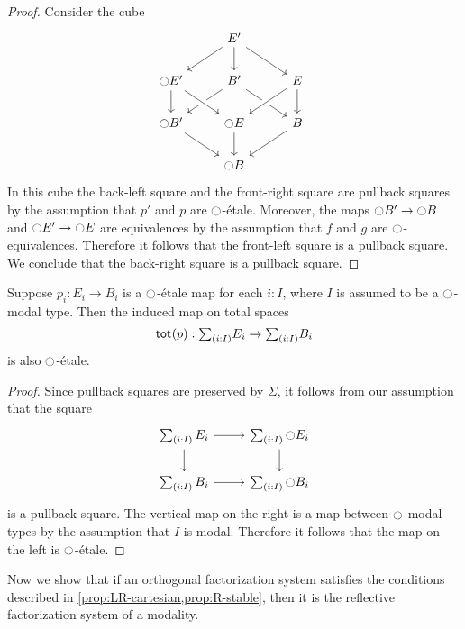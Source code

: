 \documentclass[9pt,twosided]{amsart}
\begin{document}
\begin{proof}
  Consider the cube
  \begin{equation*}
    \begin{tikzcd}
      & E' \arrow[dl] \arrow[d] \arrow[dr] & \phantom{\modal E'} \\
      \modal E' \arrow[d] & B' \arrow[dl] \arrow[dr] & E \arrow[d] \arrow[dl,crossing over] \\
      \modal B' \arrow[dr] & \modal E \arrow[from=ul,crossing over] \arrow[d] & B \arrow[dl] \\
      & \modal B & \phantom{\modal B'}
    \end{tikzcd}
  \end{equation*}
  In this cube the back-left square and the front-right square are pullback squares by the assumption that $p'$ and $p$ are ${\ocircle}$-\'etale. Moreover, the maps ${\ocircle} B'\to{\ensuremath{\ocircle}} B$ and ${\ocircle} E'\to{\ensuremath{\ocircle}} E$ are equivalences by the assumption that $f$ and $g$ are ${\ocircle}$-equivalences. Therefore it follows that the front-left square is a pullback square. We conclude that the back-right square is a pullback square.
\end{proof}

\begin{prp}\label{prop:R-stable}
  Suppose $p_i:E_i\to B_i$ is a ${\ocircle}$-\'etale map for each $i:I$, where $I$ is assumed to be a ${\ocircle}$-modal type. Then the induced map on total spaces
  \begin{equation*}
    \total{p} : \sm{i:I}E_i\to \sm{i:I}B_i
  \end{equation*}
  is also ${\ocircle}$-\'etale.
\end{prp}

\begin{proof}
  Since pullback squares are preserved by $\Sigma$, it follows from our assumption that the square
  \begin{equation*}
    \begin{tikzcd}
      \sm{i:I}E_i \arrow[r] \arrow[d] & \sm{i:I}\modal E_i \arrow[d] \\
      \sm{i:I}B_i \arrow[r] & \sm{i:I}\modal B_i
    \end{tikzcd}
  \end{equation*}
  is a pullback square. The vertical map on the right is a map between ${\ocircle}$-modal types by the assumption that $I$ is modal. Therefore it follows that the map on the left is ${\ocircle}$-\'etale.
\end{proof}

Now we show that if an orthogonal factorization system satisfies the conditions described in \cref{prop:LR-cartesian,prop:R-stable}, then it is the reflective factorization system of a modality.
\end{document}
